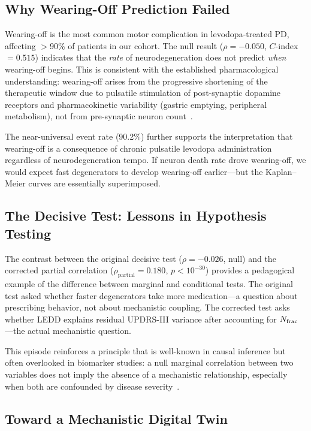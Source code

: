 \subsection{Why Wearing-Off Prediction Failed}

Wearing-off is the most common motor complication in levodopa-treated PD,
affecting $>$90\% of patients in our cohort. The null result
($\rho = -0.050$, $C$-index $= 0.515$) indicates that the \textit{rate}
of neurodegeneration does not predict \textit{when} wearing-off begins.
This is consistent with the established pharmacological understanding:
wearing-off arises from the progressive shortening of the therapeutic
window due to pulsatile stimulation of post-synaptic dopamine receptors
and pharmacokinetic variability (gastric emptying, peripheral
metabolism), not from pre-synaptic neuron count~\cite{djaldetti2018}.

The near-universal event rate (90.2\%) further supports the interpretation
that wearing-off is a consequence of chronic pulsatile levodopa
administration regardless of neurodegeneration tempo. If neuron death
rate drove wearing-off, we would expect fast degenerators to develop
wearing-off earlier---but the Kaplan--Meier curves are essentially
superimposed.


\subsection{The Decisive Test: Lessons in Hypothesis Testing}

The contrast between the original decisive test ($\rho = -0.026$,
null) and the corrected partial correlation ($\rho_\text{partial} = 0.180$,
$p < 10^{-30}$) provides a pedagogical example of the difference
between marginal and conditional tests. The original test asked whether
faster degenerators take more medication---a question about prescribing
behavior, not about mechanistic coupling. The corrected test asks
whether LEDD explains residual UPDRS-III variance after accounting for
$N_{\mathrm{frac}}$---the actual mechanistic question.

This episode reinforces a principle that is well-known in causal inference
but often overlooked in biomarker studies: a null marginal correlation
between two variables does not imply the absence of a mechanistic
relationship, especially when both are confounded by disease
severity~\cite{vuong1989}.


\subsection{Toward a Mechanistic Digital Twin}

